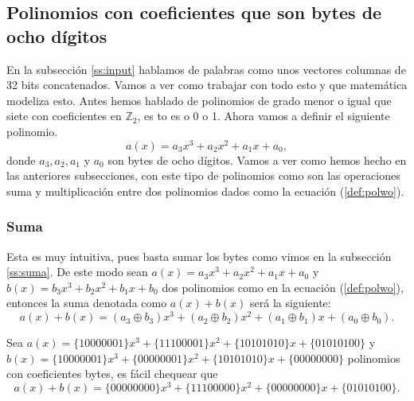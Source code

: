 
\subsection{Polinomios con coeficientes que son bytes de ocho dígitos}

En la subsección \ref{ss:input} hablamos de palabras como unos vectores columnas de 32 bits concatenados. Vamos a ver como trabajar con todo esto y que matemática modeliza esto. Antes hemos hablado de polinomios de grado menor o igual que siete con coeficientes en $\mathbb{Z}_2$, es to es o 0 o 1. Ahora vamos a definir el siguiente polinomio.
\begin{equation}\label{def:polwo}
a(x)=a_3 x^3+a_2 x^2+ a_1 x + a_0,
\end{equation}
donde $a_3,a_2,a_1$ y $a_0$ son bytes de ocho dígitos. Vamos a ver como hemos hecho en las anteriores subsecciones, con este tipo de polinomios como son las operaciones suma y multiplicación entre dos polinomios dados como la ecuación (\ref{def:polwo}).
\subsubsection{Suma}\label{ss:sumarara}
Esta es muy intuitiva,  pues basta sumar los bytes como vimos en la subsección \ref{ss:suma}. De este modo sean $a(x)=a_3 x^3+a_2 x^2+ a_1 x + a_0$ y $b(x)=b_3 x^3+b_2 x^2+ b_1 x + b_0$ dos polinomios como en la ecuación (\ref{def:polwo}), entonces la suma denotada como $a(x)+b(x)$ será la siguiente:
$$
a(x)+b(x)=(a_3 \oplus b_3) x^3+(a_2 \oplus b_2) x^2+ (a_1 \oplus b_1) x + (a_0 \oplus b_0).
$$
\begin{example}
Sea $a(x)=\{10000001\} x^3+\{11100001\} x^2+ \{10101010\} x +\{01010100\}$ y $b(x)=\{10000001\} x^3+\{00000001\} x^2+ \{10101010\} x +\{00000000\}$ polinomios con coeficientes bytes, es fácil chequear que
$$
a(x)+b(x)=\{00000000\} x^3+\{11100000\} x^2+ \{00000000\} x +\{01010100\}.
$$
\end{example}
